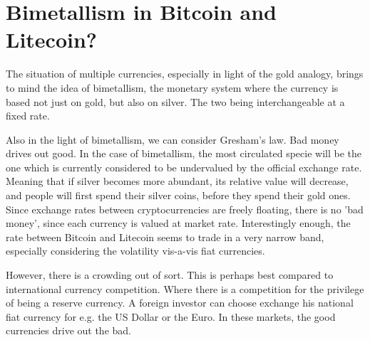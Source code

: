 
\chapter{Bimetallism in Bitcoin and Litecoin?}

The situation of multiple currencies, especially in light of the gold
analogy, brings to mind the idea of bimetallism, the monetary system
where the currency is based not just on gold, but also on silver.
The two being interchangeable at a fixed rate.

Also in the light of bimetallism, we can consider Gresham's law. Bad
money drives out good. In the case of bimetallism, the most circulated
specie will be the one which is currently considered to be undervalued
by the official exchange rate. Meaning that if silver becomes more
abundant, its relative value will decrease, and people will first
spend their silver coins, before they spend their gold ones. Since
exchange rates between cryptocurrencies are freely floating, there
is no 'bad money', since each currency is valued at market rate. Interestingly
enough, the rate between Bitcoin and Litecoin seems to trade in a
very narrow band, especially considering the volatility vis-a-vis
fiat currencies. 

However, there is a crowding out of sort. This is perhaps best compared
to international currency competition. Where there is a competition
for the privilege of being a reserve currency. A foreign investor
can choose exchange his national fiat currency for e.g. the US Dollar
or the Euro. In these markets, the good currencies drive out the bad.
